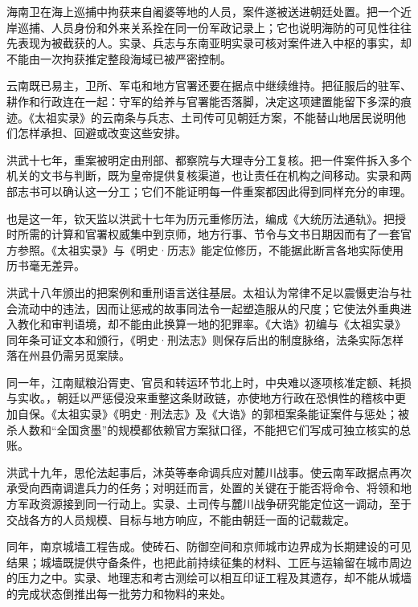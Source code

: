 海南卫在海上巡捕中拘获来自阇婆等地的人员，案件遂被送进朝廷处置。把一个近岸巡捕、人员身份和外来关系拴在同一份军政记录上；它也说明海防的可见性往往先表现为被截获的人。实录、兵志与东南亚明实录可核对案件进入中枢的事实，却不能由一次拘获推定整段海域已被严密控制。

云南既已易主，卫所、军屯和地方官署还要在据点中继续维持。把征服后的驻军、耕作和行政连在一起：守军的给养与官署能否落脚，决定这项建置能留下多深的痕迹。《太祖实录》的云南条与兵志、土司传可见朝廷方案，不能替山地居民说明他们怎样承担、回避或改变这些安排。

洪武十七年，重案被明定由刑部、都察院与大理寺分工复核。把一件案件拆入多个机关的文书与判断，既为皇帝提供复核渠道，也让责任在机构之间移动。实录和两部志书可以确认这一分工；它们不能证明每一件重案都因此得到同样充分的审理。

也是这一年，钦天监以洪武十七年为历元重修历法，编成《大统历法通轨》。把授时所需的计算和官署权威集中到京师，地方行事、节令与文书日期因而有了一套官方参照。《太祖实录》与《明史·历志》能定位修历，不能据此断言各地实际使用历书毫无差异。

洪武十八年颁出的把案例和重刑语言送往基层。太祖认为常律不足以震慑吏治与社会流动中的违法，因而让惩戒的故事同法令一起塑造服从的尺度；它使法外重典进入教化和审判语境，却不能由此换算一地的犯罪率。《大诰》初编与《太祖实录》同年条可证文本和颁行，《明史·刑法志》则保存后出的制度脉络，法条实际怎样落在州县仍需另觅案牍。

同一年，江南赋粮沿胥吏、官员和转运环节北上时，中央难以逐项核准定额、耗损与实收。，朝廷以严惩侵没来重整这条财政链，亦使地方行政在恐惧性的稽核中更加自保。《太祖实录》《明史·刑法志》及《大诰》的郭桓案条能证案件与惩处；被杀人数和“全国贪墨”的规模都依赖官方案狱口径，不能把它们写成可独立核实的总账。

洪武十九年，思伦法起事后，沐英等奉命调兵应对麓川战事。使云南军政据点再次承受向西南调遣兵力的任务；对明廷而言，处置的关键在于能否将命令、将领和地方军政资源接到同一行动上。实录、土司传与麓川战争研究能定位这一调动，至于交战各方的人员规模、目标与地方响应，不能由朝廷一面的记载裁定。

同年，南京城墙工程告成。使砖石、防御空间和京师城市边界成为长期建设的可见结果；城墙既提供守备条件，也把此前持续征集的材料、工匠与运输留在城市周边的压力之中。实录、地理志和考古测绘可以相互印证工程及其遗存，却不能从城墙的完成状态倒推出每一批劳力和物料的来处。

